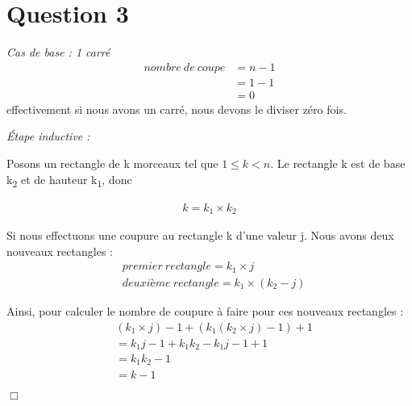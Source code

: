 \section*{Question 3}
\noindent
\emph{Cas de base : 1 carré }
\begin{align*}
	nombre\ de\ coupe & = n -1  \\
	                  & = 1 - 1 \\
	                  & = 0
\end{align*}
effectivement si nous avons un carré, nous devons le diviser zéro fois.

\bigskip
\emph{Étape inductive : }

Posons un rectangle de k morceaux tel que $ 1 \leq k < n$. Le rectangle k est de base k\textsubscript{2} et de hauteur k\textsubscript{1}, donc

\begin{align*}
k = k_1 \times k_2
\end{align*}

Si nous effectuons une coupure au rectangle k d'une valeur j. Nous avons deux nouveaux rectangles :
\begin{align*}
&premier\ rectangle = k_1 \times j\\
&deuxième\ rectangle = k_1 \times (k_2 - j)
\end{align*}

Ainsi, pour calculer le nombre de coupure à faire pour ces nouveaux rectangles : 
\begin{align*}
&(k_1 \times j) - 1 + (k_1(k_2 \times j)-1) + 1\\
&= k_1 j - 1 + k_1 k_2 - k_1 j - 1 + 1\\
&= k_1 k_2 - 1\\
&= k - 1
\end{align*}
\begin{flushright}
	$\Box$
\end{flushright}